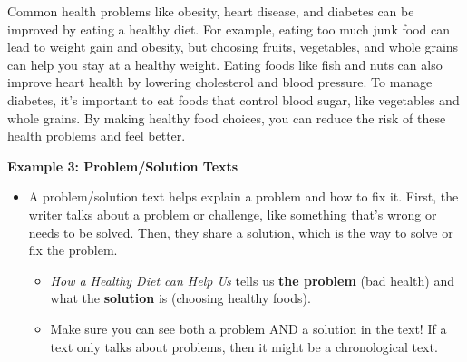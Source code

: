 \documentclass[12pt]{article}
\begin{document}
\begin{tcolorbox}[colframe=black!60, colback=white, 
coltitle=black, colbacktitle=black!15, fonttitle=\bfseries\Large, 
title=Text: How a Healthy Diet can Help Us, halign title=center, left=10pt, right=10pt, top=10pt, bottom=15pt]


Common health problems like obesity, heart disease, and diabetes can be improved by eating a healthy diet. For example, eating too much junk food can lead to weight gain and obesity, but choosing fruits, vegetables, and whole grains can help you stay at a healthy weight. Eating foods like fish and nuts can also improve heart health by lowering cholesterol and blood pressure. To manage diabetes, it's important to eat foods that control blood sugar, like vegetables and whole grains. By making healthy food choices, you can reduce the risk of these health problems and feel better.

 
\end{tcolorbox}
\vspace {0.3cm}
\begin{tcolorbox}[colframe=black!60, colback=white, 
coltitle=black, colbacktitle=black!15, fonttitle=\bfseries\Large, 
title=Examples, halign title=center, left=10pt, right=10pt, top=10pt, bottom=15pt]

\textbf{Example 3: Problem/Solution Texts}
\begin{itemize}

    \item A problem/solution text helps explain a problem and how to fix it. First, the writer talks about a problem or challenge, like something that’s wrong or needs to be solved. Then, they share a solution, which is the way to solve or fix the problem. 
    \begin{itemize}
        \item \textit{How a Healthy Diet can Help Us} tells us \textbf{the problem} (bad health) and what the \textbf{solution} is (choosing healthy foods). 
        \item Make sure you can see both a problem AND a solution in the text! If a text only talks about problems, then it might be a chronological text.
        

     
            

      
        
    \end{itemize}
\end{itemize}

\end{tcolorbox}
\end{document}
